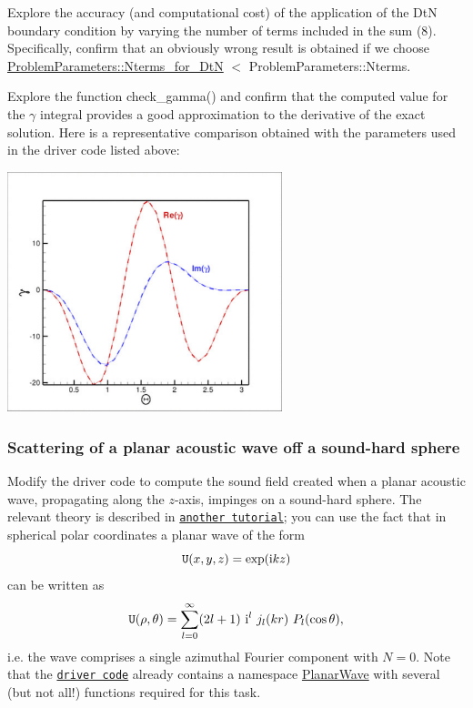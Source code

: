 \begin{DoxyItemize}
\item Explore the accuracy (and computational cost) of the application of the DtN boundary condition by varying the number of terms included in the sum (8). Specifically, confirm that an obviously wrong result is obtained if we choose {\ttfamily \hyperlink{namespaceProblemParameters_aa529b33b7feb959e0c044447bf0f6c6f}{Problem\+Parameters\+::\+Nterms\+\_\+for\+\_\+\+DtN}} $<$ {\ttfamily Problem\+Parameters\+::\+Nterms}.
\item Explore the function {\ttfamily check\+\_\+gamma()} and confirm that the computed value for the $ \gamma $ integral provides a good approximation to the derivative of the exact solution. Here is a representative comparison obtained with the parameters used in the driver code listed above\+:
\end{DoxyItemize} 
\begin{DoxyImage}
\includegraphics[width=0.6\textwidth]{compare_gamma}
\end{DoxyImage}
\hypertarget{index_sphere}{}\subsubsection{Scattering of a planar acoustic wave off a sound-\/hard sphere}\label{index_sphere}
Modify the driver code to compute the sound field created when a planar acoustic wave, propagating along the $ z $-\/axis, impinges on a sound-\/hard sphere. The relevant theory is described in \href{../../../helmholtz/scattering/html/index.html#scattering}{\tt another tutorial}; you can use the fact that in spherical polar coordinates a planar wave of the form \[ {\tt U}(x,y,z) = \exp({\rm i}kz) \] can be written as \[ {\tt U}(\rho,\theta) = \sum_{l=0}^{\infty} (2l+1) \ {\rm i}^l \ j_l(kr) \ P_l(\cos\theta), \] i.\+e. the wave comprises a single azimuthal Fourier component with $ N=0$. Note that the \href{../../../../demo_drivers/fourier_decomposed_helmholtz/sphere_scattering/sphere_scattering.cc}{\tt driver code} already contains a namespace {\ttfamily \hyperlink{namespacePlanarWave}{Planar\+Wave}} with several (but not all!) functions required for this task.



